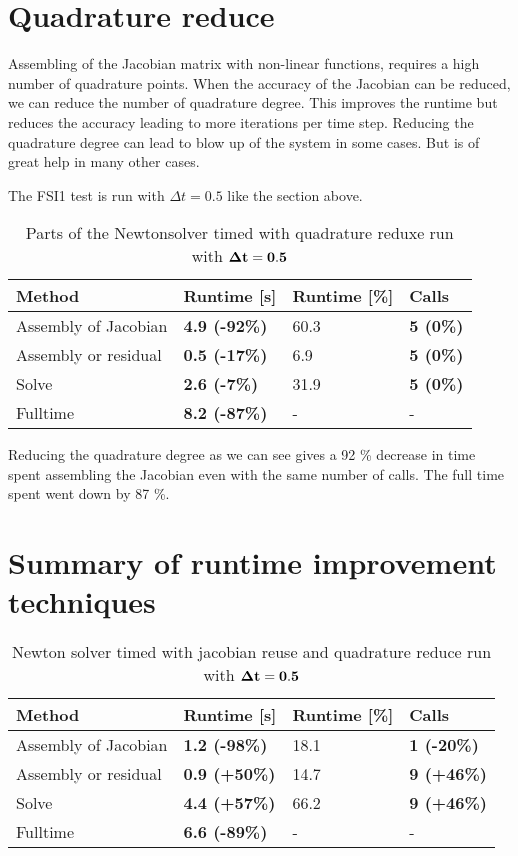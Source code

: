 \section{Quadrature reduce}
Assembling of the Jacobian matrix with non-linear functions, requires a high number of quadrature points. When the accuracy of the Jacobian can be reduced, we can reduce the number of quadrature degree. This improves the runtime but reduces the accuracy leading to more iterations per time step. Reducing the quadrature degree can lead to blow up of the system in some cases. But is of great help in many other cases.\newline

The FSI1 test is run with $\Delta t = 0.5$ like the section above.

\begin{table}[H]
\centering
\caption{Parts of the Newtonsolver timed with quadrature reduxe run with $\bold{\Delta t = 0.5}$}
\label{my-label}
\begin{tabular}{|l|l|l|l|}
\hline
Method & \textbf{Runtime {[}s{]}} & Runtime {[}\%{]} & \textbf{Calls} \\ \hline
Assembly of Jacobian & \textbf{4.9 (-92\%)} & 60.3 & \textbf{5 (0\%)} \\ \hline
Assembly or residual & \textbf{0.5 (-17\%)} & 6.9 & \textbf{5 (0\%)} \\ \hline
Solve & \textbf{2.6 (-7\%)} & 31.9 & \textbf{5 (0\%)} \\ \hline
Fulltime & \textbf{8.2 (-87\%)} & - & - \\ \hline
\end{tabular}
\end{table}

Reducing the quadrature degree as we can see gives a 92 \% decrease in time spent assembling the Jacobian even with the same number of calls. The full time spent went down by 87 \%.

\section{Summary of runtime improvement techniques}


\begin{table}[H]
\centering
\caption{Newton solver timed with jacobian reuse and quadrature reduce run with $\bold{\Delta t = 0.5}$}
\label{both_tech}
\begin{tabular}{|l|l|l|l|}
\hline
Method & \textbf{Runtime {[}s{]}} & Runtime {[}\%{]} & \textbf{Calls} \\ \hline
Assembly of Jacobian & \textbf{1.2 (-98\%)} & 18.1 & \textbf{1 (-20\%)} \\ \hline
Assembly or residual & \textbf{0.9 (+50\%)} & 14.7 & \textbf{9 (+46\%)} \\ \hline
Solve & \textbf{4.4 (+57\%)} & 66.2 & \textbf{9 (+46\%)} \\ \hline
Fulltime & \textbf{6.6 (-89\%)} & - & - \\ \hline
\end{tabular}
\end{table}

